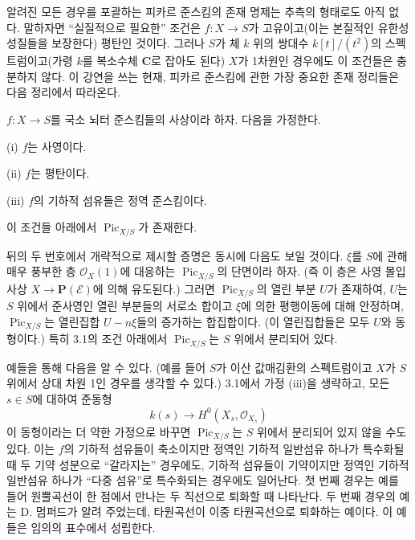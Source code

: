 
알려진 모든 경우를 포괄하는 피카르 준스킴의 존재 명제는 추측의 형태로도
아직 없다. 말하자면 “실질적으로 필요한” 조건은
$f:X\longrightarrow S$가 고유이고(이는 본질적인 유한성 성질들을
보장한다) 평탄인 것이다. 그러나 $S$가 체 $k$ 위의 쌍대수
$k[t]/(t^2)$의 스펙트럼이고(가령 $k$를 복소수체 $\mathbf C$로 잡아도
된다) $X$가 1차원인 경우에도 이 조건들은 충분하지 않다. 이 강연을 쓰는
현재, 피카르 준스킴에 관한 가장 중요한 존재 정리들은 다음 정리에서
따라온다.

 $f:X\longrightarrow S$를 국소 뇌터 준스킴들의
사상이라 하자. 다음을 가정한다.

\noindent (i) $f$는 사영이다.

\noindent (ii) $f$는 평탄이다.

\noindent (iii) $f$의 기하적 섬유들은 정역 준스킴이다.

이 조건들 아래에서 $\operatorname{Pic}_{X/S}$가 존재한다.

뒤의 두 번호에서 개략적으로 제시할 증명은 동시에 다음도 보일 것이다.
$\xi$를 $S$에 관해 매우 풍부한 층 $\mathcal O_X(1)$에 대응하는
$\operatorname{Pic}_{X/S}$의 단면이라 하자. (즉 이 층은 사영 몰입 사상
$X\longrightarrow\mathbf P(\mathcal E)$에 의해 유도된다.) 그러면
$\operatorname{Pic}_{X/S}$의 열린 부분 $U$가 존재하여, $U$는 $S$ 위에서
준사영인 열린 부분들의 서로소 합이고 $\xi$에 의한 평행이동에 대해
안정하며, $\operatorname{Pic}_{X/S}$는 열린집합 $U-n\xi$들의 증가하는
합집합이다. (이 열린집합들은 모두 $U$와 동형이다.) 특히 3.1의 조건
아래에서 $\operatorname{Pic}_{X/S}$는 $S$ 위에서 분리되어 있다.

 예들을 통해 다음을 알 수 있다. (예를 들어 $S$가 이산
값매김환의 스펙트럼이고 $X$가 $S$ 위에서 상대 차원 1인 경우를 생각할 수
있다.) 3.1에서 가정 (iii)을 생략하고, 모든 $s\in S$에 대하여 준동형
\[
k(s)\longrightarrow H^0(X_s,\mathcal O_{X_s})
\]
이 동형이라는 더 약한 가정으로 바꾸면 $\operatorname{Pic}_{X/S}$는
$S$ 위에서 분리되어 있지 않을 수도 있다. 이는 $f$의 기하적 섬유들이
축소이지만 정역인 기하적 일반섬유 하나가 특수화될 때 두 기약 성분으로
``갈라지는'' 경우에도, 기하적 섬유들이 기약이지만 정역인 기하적
일반섬유 하나가 ``다중 섬유''로 특수화되는 경우에도 일어난다. 첫 번째
경우는 예를 들어 원뿔곡선이 한 점에서 만나는 두 직선으로 퇴화할 때
나타난다. 두 번째 경우의 예는 D. 멈퍼드가 알려 주었는데, 타원곡선이
이중 타원곡선으로 퇴화하는 예이다. 이 예들은 임의의 표수에서 성립한다.

